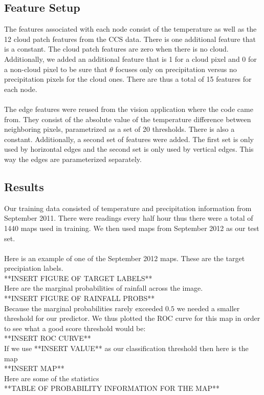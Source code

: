 \subsection{Feature Setup}

The features associated with each node consist of the temperature as well as the 12 cloud patch features from the CCS data. There is one additional feature that is a constant. The cloud patch features are zero when there is no cloud. Additionally, we added an additional feature that is 1 for a cloud pixel and 0 for a non-cloud pixel to be sure that $\theta$ focuses only on precipitation versus no precipitation pixels for the cloud ones. There are thus a total of 15 features for each node. \\
\\
The edge features were reused from the vision application where the code came from. They consist of the absolute value of the temperature difference between neighboring pixels, parametrized as a set of 20 thresholds. There is also a constant. Additionally, a second set of features were added. The first set is only used by horizontal edges and the second set is only used by vertical edges. This way the edges are parameterized separately. 

\subsection{Results}

Our training data consisted of temperature and precipitation information from September 2011. There were readings every half hour thus there were a total of 1440 maps used in training. We then used maps from September 2012 as our test set. \\
\\
Here is an example of one of the September 2012 maps. These are the target precipiation labels. \\
**INSERT FIGURE OF TARGET LABELS**\\
Here are the marginal probabilities of rainfall across the image.\\
**INSERT FIGURE OF RAINFALL PROBS**\\
Because the marginal probabilities rarely exceeded $0.5$ we needed a smaller threshold for our predictor. We thus plotted the ROC curve for this map in order to see what a good score threshold would be:\\
**INSERT ROC CURVE** \\
If we use **INSERT VALUE** as our classification threshold then here is the map\\
**INSERT MAP**\\
Here are some of the statistics \\
**TABLE OF PROBABILITY INFORMATION FOR THE MAP**

